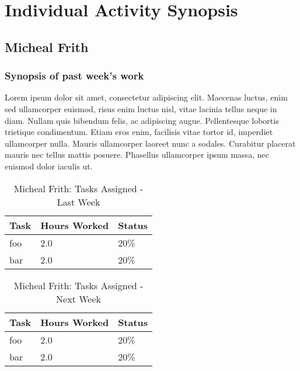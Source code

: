\documentclass[12pt,article,compsoc]{IEEEtran}
\begin{document}
\section{Individual Activity Synopsis}
	\subsection{Micheal Frith}

	\subsubsection*{Synopsis of past week's work}

	Lorem ipsum dolor sit amet, consectetur adipiscing elit. Maecenas luctus, enim sed ullamcorper euismod, risus enim luctus nisl, vitae lacinia tellus neque in diam. Nullam quis bibendum felis, ac adipiscing augue. Pellentesque lobortis tristique condimentum. Etiam eros enim, facilisis vitae tortor id, imperdiet ullamcorper nulla. Mauris ullamcorper laoreet nunc a sodales. Curabitur placerat mauris nec tellus mattis posuere. Phasellus ullamcorper ipsum massa, nec euismod dolor iaculis ut.


	\begin{table}[ht]
	\renewcommand{\arraystretch}{1.3}
		\caption{Micheal Frith: Tasks Assigned - Last Week}
		
		\label{Summary of Micheal Frith's activities: this week}
		
		\centering
		\begin{tabular}{p{5.5cm}|p{1cm}|p{1cm}} 
		\hline
		\bfseries 	Task		 		& \bfseries Hours Worked	& \bfseries Status	\\
		\hline\hline
					foo					& 2.0						& 20\%				\\	%
					bar					& 2.0						& 20\%				\\	
		\hline
		\end{tabular}
	\end{table}

	\begin{table}[ht]
	\renewcommand{\arraystretch}{1.3}
		\caption{Micheal Frith: Tasks Assigned - Next Week}
		
		\label{Summary of Micheal Frith's activities: this week}
		
		\centering
		\begin{tabular}{p{5.5cm}|p{1cm}|p{1cm}}
		\hline
		\bfseries 	Task		 		& \bfseries Hours Worked	& \bfseries Status	\\
		\hline\hline
					foo					& 2.0						& 20\%				\\	%
					bar					& 2.0						& 20\%				\\	
		\hline
		\end{tabular}
	\end{table}
\end{document}
